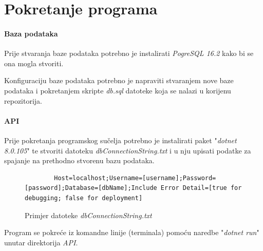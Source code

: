 \documentclass[zavrsnirad]{fer}
\begin{document}

\backmatter




\chapter{Pokretanje programa}

\subsubsection{Baza podataka}
Prije stvaranja baze podataka potrebno je instalirati \textit{PogreSQL 16.2} kako bi se ona mogla stvoriti.

Konfiguraciju baze podataka potrebno je napraviti stvaranjem nove baze podataka i pokretanjem skripte \textit{db.sql} datoteke koja se nalazi u korijenu repozitorija.

\subsubsection{API}
Prije pokretanja programskog sučelja potrebno je instalirati paket "\textit{dotnet 8.0.105}" te stvoriti datoteku \textit{dbConnectionString.txt} i u nju upisati podatke za spajanje na prethodno stvorenu bazu podataka.
\begin{figure}[htb]
	\centering
	\begin{lstlisting}
		Host=localhost;Username=[username];Password=[password];Database=[dbName];Include Error Detail=[true for debugging; false for deployment]
	\end{lstlisting}
	\caption{Primjer datoteke \textit{dbConnectionString.txt}}
\end{figure}
\FloatBarrier

Program se pokreće iz komandne linije (terminala) pomoću naredbe "\textit{dotnet run}" unutar direktorija \textit{API}.
\end{document}
